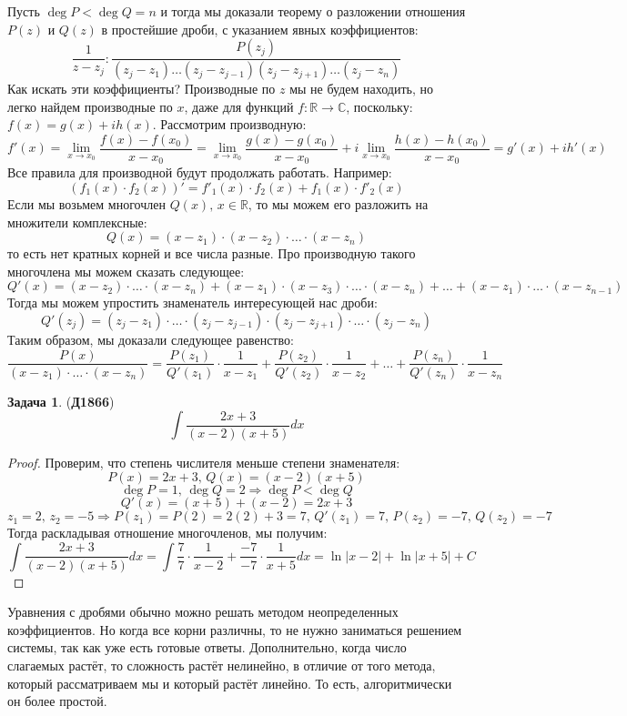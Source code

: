 \documentclass[12pt]{article}
\newcommand{\MR}{\mathbb{R}}
\newcommand{\MC}{\mathbb{C}}
\theoremstyle{definition}
\newtheorem{problem}{Задача}
\DeclareMathOperator{\dint}{\displaystyle\int}
\begin{document}
Пусть $\deg{P} < \deg{Q} = n$ и тогда мы доказали теорему о разложении отношения $P(z)$ и $Q(z)$ в простейшие дроби, с указанием явных коэффициентов:
$$
	\dfrac{1}{z - z_j} \colon \dfrac{P(z_j)}{(z_j - z_1)\dotsc (z_j - z_{j-1})(z_j - z_{j+1})\dotsc(z_j - z_n)}
$$
Как искать эти коэффициенты? Производные по $z$ мы не будем находить, но легко найдем производные по $x$, даже для функций $f\colon \MR \to \MC$, поскольку: $f(x) = g(x) + ih(x)$. Рассмотрим производную:
$$
	f'(x) = \lim\limits_{x \to x_0}\dfrac{f(x) - f(x_0)}{x - x_0} = \lim\limits_{x \to x_0}\dfrac{g(x) - g(x_0)}{x - x_0} + i \lim\limits_{x \to x_0} \dfrac{h(x) - h(x_0)}{x - x_0} = g'(x) + ih'(x)
$$
Все правила для производной будут продолжать работать. Например: 
$$
	(f_1(x){\cdot}f_2(x))' = f'_1(x){\cdot}f_2(x) + f_1(x){\cdot}f'_2(x)
$$
Если мы возьмем многочлен $Q(x), \, x \in \MR$, то мы можем его разложить на множители комплексные:
$$
	Q(x) = (x - z_1){\cdot}(x - z_2){\cdot}\dotsc{\cdot}(x - z_n)
$$
то есть нет кратных корней и все числа разные. Про производную такого многочлена мы можем сказать следующее:
$$
	Q'(x) = (x - z_2){\cdot}\dotsc {\cdot}(x - z_n) + (x - z_1){\cdot}(x - z_3){\cdot}\dotsc{\cdot} (x- z_n) + \dotsc + (x - z_1){\cdot}\dotsc{\cdot}(x - z_{n-1}) 
$$
Тогда мы можем упростить знаменатель интересующей нас дроби:
$$
	Q'(z_j) = (z_j - z_1){\cdot}\dotsc{\cdot}(z_j - z_{j-1}){\cdot}(z_j - z_{j+1}){\cdot}\dotsc{\cdot}(z_j - z_n)
$$
Таким образом, мы доказали следующее равенство:
$$
	\dfrac{P(x)}{(x- z_1){\cdot}\dotsc {\cdot}( x - z_n)}= \dfrac{P(z_1)}{Q'(z_1)}{\cdot}\dfrac{1}{x-z_1} + \dfrac{P(z_2)}{Q'(z_2)}{\cdot}\dfrac{1}{x-z_2} + \dotsc + \dfrac{P(z_n)}{Q'(z_n)}{\cdot}\dfrac{1}{x-z_n}
$$
\newpage
\begin{problem}(\textbf{Д1866})
	$$
		\dint \dfrac{2x + 3}{(x-2)(x+5)}dx
	$$
\end{problem}
\begin{proof}
	Проверим, что степень числителя меньше степени знаменателя:
	$$
		P(x) = 2x + 3, \, Q(x) = (x-2)(x + 5)
	$$
	$$
		\deg{P} = 1, \, \deg{Q} = 2 \Rightarrow \deg{P} < \deg{Q}
	$$
	$$
		Q'(x) = (x + 5) + (x- 2) = 2x + 3 
	$$
	$$
		z_1 = 2, \, z_2 = -5 \Rightarrow P(z_1) = P(2) = 2(2) + 3 = 7, \, Q'(z_1) = 7 , \, P(z_2) = - 7, \, Q(z_2) = -7 
	$$
	Тогда раскладывая отношение многочленов, мы получим:
	$$
		\dint \dfrac{2x + 3}{(x-2)(x+5)}dx =\dint \dfrac{7}{7}{\cdot}\dfrac{1}{x-2} + \dfrac{-7}{-7}{\cdot}\dfrac{1}{x+5} dx = \ln|x - 2| + \ln|x + 5| + C
	$$
\end{proof}

Уравнения с дробями обычно можно решать методом неопределенных коэффициентов. Но когда все корни различны, то не нужно заниматься решением системы, так как уже есть готовые ответы. Дополнительно, когда число слагаемых растёт, то сложность растёт нелинейно, в отличие от того метода, который рассматриваем мы и который растёт линейно. То есть, алгоритмически он более простой.
\end{document}
